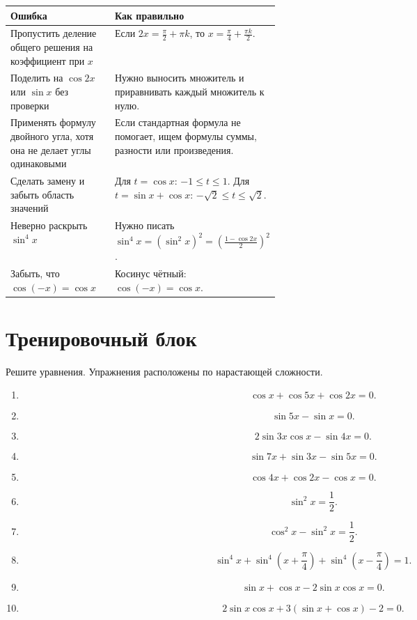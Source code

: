 \documentclass[a4paper,12pt]{article}
\begin{document}
\begin{center}
\renewcommand{\arraystretch}{1.45}
\begin{tabularx}{\linewidth}{@{}p{0.45\linewidth}X@{}}
\toprule
Ошибка & Как правильно \\
\midrule
Пропустить деление общего решения на коэффициент при $x$ &
Если $2x=\frac{\pi}{2}+\pi k$, то $x=\frac{\pi}{4}+\frac{\pi k}{2}$. \\

Поделить на $\cos 2x$ или $\sin x$ без проверки &
Нужно выносить множитель и приравнивать каждый множитель к нулю. \\

Применять формулу двойного угла, хотя она не делает углы одинаковыми &
Если стандартная формула не помогает, ищем формулы суммы, разности или произведения. \\

Сделать замену и забыть область значений &
Для $t=\cos x$: $-1\le t\le1$. Для $t=\sin x+\cos x$: $-\sqrt2\le t\le\sqrt2$. \\

Неверно раскрыть $\sin^4 x$ &
Нужно писать $\sin^4 x=(\sin^2 x)^2=\left(\frac{1-\cos 2x}{2}\right)^2$. \\

Забыть, что $\cos(-x)=\cos x$ &
Косинус чётный: $\cos(-x)=\cos x$. \\
\bottomrule
\end{tabularx}
\end{center}

\newpage

\section*{\textcolor{darkaccent}{Тренировочный блок}}

Решите уравнения. Упражнения расположены по нарастающей сложности.

\begin{enumerate}
\item
\[
\cos x+\cos 5x+\cos 2x=0.
\]

\item
\[
\sin 5x-\sin x=0.
\]

\item
\[
2\sin 3x\cos x-\sin 4x=0.
\]

\item
\[
\sin 7x+\sin 3x-\sin 5x=0.
\]

\item
\[
\cos 4x+\cos 2x-\cos x=0.
\]

\item
\[
\sin^2 x=\frac12.
\]

\item
\[
\cos^2 x-\sin^2 x=\frac12.
\]

\item
\[
\sin^4 x+\sin^4\left(x+\frac{\pi}{4}\right)+\sin^4\left(x-\frac{\pi}{4}\right)=1.
\]

\item
\[
\sin x+\cos x-2\sin x\cos x=0.
\]

\item
\[
2\sin x\cos x+3(\sin x+\cos x)-2=0.
\]
\end{enumerate}
\end{document}
